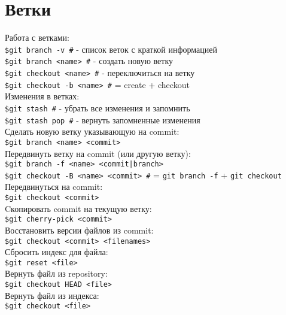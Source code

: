 \section{Ветки}

Работа с ветками: \\
\indent \texttt{\$git branch -v \indent \#} - список веток с краткой информацией\\
\indent \texttt{\$git branch <name> \indent \#} - создать новую ветку \\
\indent \texttt{\$git checkout <name> \indent \#} - переключиться на ветку\\
\indent \texttt{\$git checkout -b <name> \indent \#} = create + checkout \\

\noindent Изменения в ветках: \\

\indent \texttt{\$git stash \indent \#} - убрать все изменения и запомнить \\
\indent \texttt{\$git stash pop \indent \#} - вернуть запомненные изменения \\

\noindent Сделать новую ветку указывающую на commit:\\
\indent \texttt{\$git branch <name> <commit>}  \\
Передвинуть ветку на commit (или другую ветку):  \\
\indent \texttt{\$git branch -f <name> <commit|branch>} \\ 
\indent \texttt{\$git checkout -B <name> <commit> \indent \#}  = \texttt{git branch -f}  + \texttt{git checkout} \\
Передвинуться на commit:\\
\indent \texttt{\$git checkout <commit>} \\


\noindent Cкопировать commit на текущую ветку: \\
\indent \texttt{\$git cherry-pick <commit>}   \\

\noindent Восстановить версии файлов из commit:\\
\indent \texttt{\$git checkout <commit> <filenames>} \\
Сбросить индекс для файла: \\
\indent \texttt{\$git reset <file>} \\
Вернуть файл из repository: \\
\indent \texttt{\$git checkout HEAD <file>}  \\
Вернуть файл из индекса: \\
\indent \texttt{\$git checkout <file>}  \\

